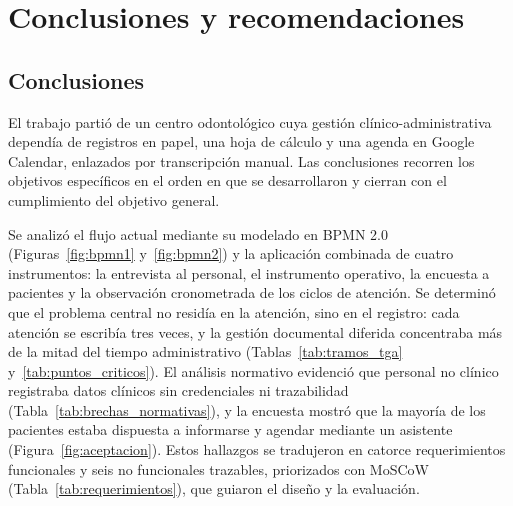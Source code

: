 \section{Conclusiones y recomendaciones}

\subsection{Conclusiones}

El trabajo partió de un centro odontológico cuya gestión clínico-administrativa dependía de registros en papel, una hoja de cálculo y una agenda en Google Calendar, enlazados por transcripción manual. Las conclusiones recorren los objetivos específicos en el orden en que se desarrollaron y cierran con el cumplimiento del objetivo general.

Se analizó el flujo actual mediante su modelado en BPMN 2.0 (Figuras~\ref{fig:bpmn1} y~\ref{fig:bpmn2}) y la aplicación combinada de cuatro instrumentos: la entrevista al personal, el instrumento operativo, la encuesta a pacientes y la observación cronometrada de los ciclos de atención. Se determinó que el problema central no residía en la atención, sino en el registro: cada atención se escribía tres veces, y la gestión documental diferida concentraba más de la mitad del tiempo administrativo (Tablas~\ref{tab:tramos_tga} y~\ref{tab:puntos_criticos}). El análisis normativo evidenció que personal no clínico registraba datos clínicos sin credenciales ni trazabilidad (Tabla~\ref{tab:brechas_normativas}), y la encuesta mostró que la mayoría de los pacientes estaba dispuesta a informarse y agendar mediante un asistente (Figura~\ref{fig:aceptacion}). Estos hallazgos se tradujeron en catorce requerimientos funcionales y seis no funcionales trazables, priorizados con MoSCoW (Tabla~\ref{tab:requerimientos}), que guiaron el diseño y la evaluación.


